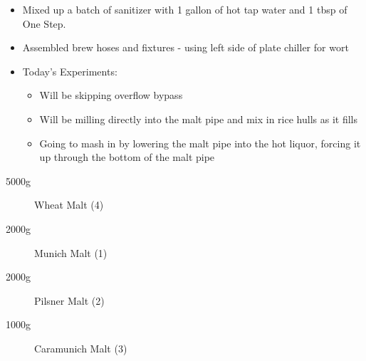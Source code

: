 \def\todaysdate{20201113}
\newday{\todaysdate}\label{\todaysdate}


\begin{itemize}
    \item Mixed up a batch of sanitizer with 1 gallon of hot tap water and 1 tbsp of One Step.
    \item Assembled brew hoses and fixtures - using left side of plate chiller for wort
    \item Today's Experiments:
        \begin{itemize}
            \item Will be skipping overflow bypass
            \item Will be milling directly into the malt pipe and mix in rice hulls as it fills
            \item Going to mash in by lowering the malt pipe into the hot liquor, forcing it up through the bottom of the malt pipe
        \end{itemize}
\end{itemize}

\begin{description}
    \item[5000g] Wheat Malt (4)
    \item[2000g] Munich Malt (1)
    \item[2000g] Pilsner Malt (2)
    \item[1000g] Caramunich Malt (3)
\end{description}

